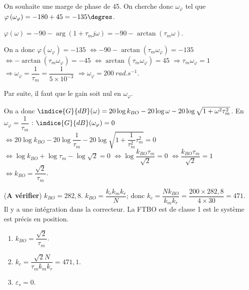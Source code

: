 \begin{corrigebox}
On souhaite une marge de phase de 45\degres. On cherche donc $\omega_{\varphi}$ tel que 
$\varphi\left(\omega_{\varphi}\right)=-180+45 = -135\degres$.

$\varphi(\omega)=-90-\arg\left(1+\tau_m j \omega \right) =-90-\arctan\left(\tau_m  \omega \right)  $.

On a donc $\varphi\left(\omega_{\varphi}\right)=-135$
$\Leftrightarrow -90-\arctan\left(\tau_m  \omega_{\varphi}\right)  = -135 $
$\Leftrightarrow -\arctan\left(\tau_m  \omega_{\varphi} \right)  = -45 $
$\Leftrightarrow \arctan\left(\tau_m  \omega_{\varphi} \right)  = 45 $
$\Rightarrow \tau_m  \omega_{\varphi} = 1 $
$\Rightarrow \omega_{\varphi}  = \dfrac{1}{\tau_m}= \dfrac{1}{5\times 10^{-3}}$
$\Rightarrow \omega_{\varphi}  = \SI{200}{rad.s^{-1}}$.

Par suite, il faut que le gain soit nul en $\omega_{\varphi}$.

On a donc $\indice{G}{dB}(\omega)=20\log k_{BO}-20\log\omega-20\log\sqrt{1+\omega^2\tau_m^2}$.
En $\omega_{\varphi} =  \dfrac{1}{\tau_m}$ :
$\indice{G}{dB}(\omega_{\varphi})=0$ 
$\Leftrightarrow 20\log k_{BO}-20\log \dfrac{1}{\tau_m}-20\log\sqrt{1+\dfrac{1}{\tau_m^2}\tau_m^2}=0$
$\Leftrightarrow \log k_{BO}+\log \tau_m-\log\sqrt{2}=0$
$\Leftrightarrow \log \dfrac{k_{BO} \tau_m}{\sqrt{2}}=0$
$\Leftrightarrow \dfrac{k_{BO} \tau_m}{\sqrt{2}}=1$
$\Leftrightarrow k_{BO}=\dfrac{\sqrt{2}}{\tau_m}$.

(\textbf{A vérifier})
$k_{BO}=282,8$.
$k_{BO}=\dfrac{k_c k_m k_r}{N}$; donc 
$k_c=\dfrac{Nk_{BO}}{ k_m k_r} = \dfrac{200 \times 282,8 }{4\times 30}=471$.
Il y a une intégration dans la correcteur. La FTBO est de classe 1 est le système est précis en position.

\begin{enumerate}
  \item $k_{BO}=\dfrac{\sqrt{2}}{\tau_m}$.
  \item $k_c=\dfrac{\sqrt{2}N}{\tau_m k_m k_r} = 471,1$.
  \item $\varepsilon_s=0$.
\end{enumerate}
\end{corrigebox}
